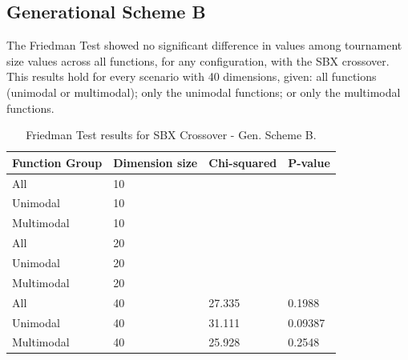 \subsection{Generational Scheme B}


The Friedman Test showed no significant difference in values among tournament size values across all functions, for any configuration, with the SBX crossover. This results hold for every scenario with 40 dimensions, given: all functions (unimodal or multimodal); only the unimodal functions; or only the multimodal functions. 

\begin{table}[h]
	\centering
	\begin{tabular}{|l|l|l|l|}
		\hline
		\textbf{Function Group} & \textbf{Dimension size}      & \textbf{Chi-squared}        & \textbf{P-value}                     \\ \hline
		\multicolumn{1}{|l|}{All} & \multicolumn{1}{|l|}{10} & \multicolumn{1}{l|}{ } & \multicolumn{1}{l|}{ } \\ \hline
		\multicolumn{1}{|l|}{Unimodal} & \multicolumn{1}{|l|}{10} & \multicolumn{1}{l|}{ } & \multicolumn{1}{l|}{ } \\ \hline
		\multicolumn{1}{|l|}{Multimodal} & \multicolumn{1}{|l|}{10} & \multicolumn{1}{l|}{ } & \multicolumn{1}{l|}{ }  \\ \hline
		\hline
		\multicolumn{1}{|l|}{All} & \multicolumn{1}{|l|}{20} & \multicolumn{1}{l|}{ } & \multicolumn{1}{l|}{ } \\ \hline
		\multicolumn{1}{|l|}{Unimodal} & \multicolumn{1}{|l|}{20} & \multicolumn{1}{l|}{ } & \multicolumn{1}{l|}{ } \\ \hline
		\multicolumn{1}{|l|}{Multimodal} & \multicolumn{1}{|l|}{20} & \multicolumn{1}{l|}{ } & \multicolumn{1}{l|}{ }  \\ \hline
		\hline	
		\multicolumn{1}{|l|}{All} & \multicolumn{1}{|l|}{40} & \multicolumn{1}{l|}{27.335} & \multicolumn{1}{l|}{0.1988} 						\\ \hline
		\multicolumn{1}{|l|}{Unimodal} & \multicolumn{1}{|l|}{40} & \multicolumn{1}{l|}{31.111} & \multicolumn{1}{l|}{0.09387} \\ \hline
		\multicolumn{1}{|l|}{Multimodal} & \multicolumn{1}{|l|}{40} & \multicolumn{1}{l|}{25.928} & \multicolumn{1}{l|}{0.2548}  \\ \hline
	\end{tabular}
	\caption{Friedman Test results for SBX Crossover - Gen. Scheme B.}
	\label{Friedman_test_uniform-B}	
\end{table}

